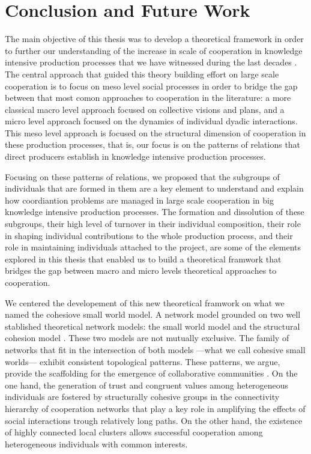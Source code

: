 \chapter{Conclusion and Future Work}
\label{conclusion}

The main objective of this thesis was to develop a theoretical framework in order to further our understanding of the increase in scale of cooperation in knowledge intensive production processes that we have witnessed during the last decades \citet*{uzzi:2007a}. The central approach that guided this theory building effort on large scale cooperation is to focus on meso level social processes in order to bridge the gap between that most comon approaches to cooperation in the literature: a more classical macro level approach focused on collective visions and plans, and a micro level approach focused on the dynamics of individual dyadic interactions. This meso level approach is focused on the structural dimension of cooperation in these production processes, that is, our focus is on the patterns of relations that direct producers establish in knowledge intensive production processes.

Focusing on these patterns of relations, we proposed that the subgroups of individuals that are formed in them are a key element to understand and explain how coordiantion problems are managed in large scale cooperation in big knowledge intensive production processes. The formation and dissolution of these subgroups, their high level of turnover in their individual composition, their role in shaping individual contributions to the whole production process, and their role in maintaining individuals attached to the project, are some of the elements explored in this thesis that enabled us to build a theoretical framwork that bridges the gap between macro and micro levels theoretical approaches to cooperation.

We centered the developement of this new theoretical framwork on what we named the cohesiove small world model. A network model grounded on two well stablished theoretical network models: the small world model \citep{watts:1998} and the structural cohesion model \citep{white:2001, moody:2003}. These two models are not mutually exclusive. The family of networks that fit in the intersection of both models ---what we call cohesive small worlds--- exhibit consistent topological patterns. These patterns, we argue, provide the scaffolding for the emergence of collaborative communities \citep{adler: 2006}. On the one hand, the generation of trust and congruent values among heterogeneous individuals are fostered by structurally cohesive groups in the connectivity hierarchy of cooperation networks that play a key role in amplifying the effects of social interactions trough relatively long paths. On the other hand, the existence of highly connected local clusters allows successful cooperation among heterogeneous individuals with common interests.

